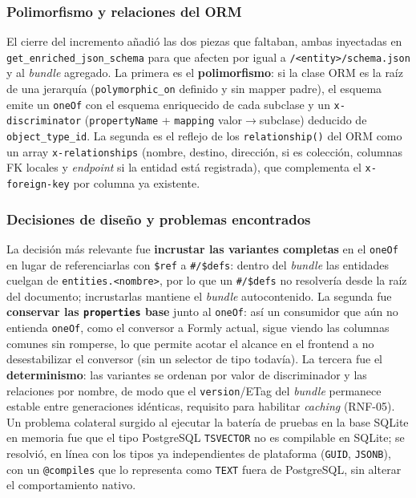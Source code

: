 \subsubsection{Polimorfismo y relaciones del ORM}
El cierre del incremento añadió las dos piezas que faltaban, ambas inyectadas
en \texttt{get\_\allowbreak enriched\_\allowbreak json\_\allowbreak schema} para que afecten por igual a
\texttt{/\allowbreak <entity>\allowbreak /\allowbreak schema.\allowbreak json} y al \emph{bundle} agregado. La primera es el
\textbf{polimorfismo}: si la clase ORM es la raíz de una jerarquía
(\texttt{polymorphic\_\allowbreak on} definido y sin mapper padre), el esquema emite un
\texttt{oneOf} con el esquema enriquecido de cada subclase y un
\texttt{x-\allowbreak discriminator} (\texttt{propertyName} +
\texttt{mapping} valor$\rightarrow$subclase) deducido de
\texttt{object\_\allowbreak type\_\allowbreak id}. La segunda es el reflejo de los
\texttt{relationship\allowbreak ()} del ORM como un array \texttt{x-\allowbreak relationships}
(nombre, destino, dirección, si es colección, columnas FK locales y
\emph{endpoint} si la entidad está registrada), que complementa el
\texttt{x-foreign-key} por columna ya existente.

\subsubsection{Decisiones de diseño y problemas encontrados}
La decisión más relevante fue \textbf{incrustar las variantes completas} en el
\texttt{oneOf} en lugar de referenciarlas con \texttt{\$ref} a
\texttt{\#/\$defs}: dentro del \emph{bundle} las entidades cuelgan de
\texttt{entities.<nombre>}, por lo que un \texttt{\#/\$defs} no resolvería
desde la raíz del documento; incrustarlas mantiene el \emph{bundle}
autocontenido. La segunda fue \textbf{conservar las \texttt{properties} base}
junto al \texttt{oneOf}: así un consumidor que aún no entienda \texttt{oneOf}, 
como el conversor a Formly actual, sigue viendo las columnas comunes sin
romperse, lo que permite acotar el alcance en el frontend a no desestabilizar
el conversor (sin un selector de tipo todavía). La tercera fue el
\textbf{determinismo}: las variantes se ordenan por valor de discriminador y
las relaciones por nombre, de modo que el \texttt{version}/ETag del
\emph{bundle} permanece estable entre generaciones idénticas, requisito para habilitar
\emph{caching} (RNF-05). Un problema colateral surgido al ejecutar la batería
de pruebas en la base SQLite en memoria fue que el tipo PostgreSQL
\texttt{TSVECTOR} no es compilable en SQLite; se resolvió, en línea con los
tipos ya independientes de plataforma (\texttt{GUID}, \texttt{JSONB}), con un
\texttt{@compiles} que lo representa como \texttt{TEXT} fuera de PostgreSQL,
sin alterar el comportamiento nativo.

